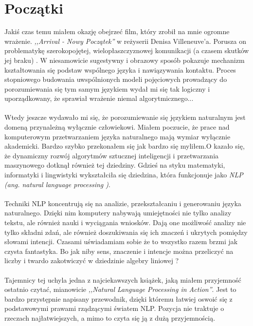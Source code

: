 \section{Początki}
Jakiś czas temu miałem okazję obejrzeć film, który zrobił na mnie ogromne wrażenie. \textit{,,Arrival - Nowy Początek''} w reżyserii Denisa Villeneuve’a.
Porusza on problematykę szerokopojętej, wielopłaszczyznowej komunikacji (a czasem skutków jej braku) . W niesamowicie sugestywny i obrazowy sposób pokazuje mechanizm kształtowania się podstaw wspólnego języka i nawiązywania kontaktu.
Proces stopniowego budowania uwspólnionych modeli pojęciowych prowadzący do porozumiewania się tym samym językiem wydał mi się tak logiczny i uporządkowany, że sprawiał wrażenie niemal algorytmicznego...

\paragraph{}
Wtedy jeszcze wydawało mi się, że porozumiewanie się językiem naturalnym jest domeną przynależną wyłącznie człowiekowi.
Miałem poczucie, że prace nad komputerowym przetwarzaniem języka naturalnego mają wymiar wyłącznie akademicki.
Bardzo szybko przekonałem się jak bardzo się myliłem.O kazało się, że dynamiczny rozwój algorytmów sztucznej inteligencji i
przetwarzania maszynowego dotknął również tej dziedziny. Gdzieś na styku matematyki, informatyki i lingwistyki wykształciła się
dziedzina, która funkcjonuje jako\textit{ NLP (ang.  natural language processing )}.
	
\paragraph{}
Techniki NLP koncentrują się na analizie, przekształcaniu i generowaniu języka naturalnego.
Dzięki nim komputery nabywają umiejętności nie tylko analizy tekstu, ale również nauki i wyciągania wniosków.
Dają one możliwość analizy nie tylko składni zdań, ale również doszukiwania się ich znaczeń i ukrytych pomiędzy słowami intencji.
Czasami uświadamiam sobie że to wszystko razem brzmi jak czysta fantastyka. Bo jak niby sens, znaczenie i intencje można przeliczyć na liczby i twardo
zakotwiczyć w dziedzinie algebry liniowej ?
\paragraph{}
Tajemnicy tej uchyla jedna z najciekawszych książek, jaką miałem przyjemność ostatnio czytać, mianowicie \textit{,,Natural Language Processing in Action''}.
Jest to bardzo przystępnie napisany przewodnik, dzięki któremu łatwiej oswoić się z podstawowymi prawami rządzącymi światem NLP.
Pozycja nie traktuje o rzeczach najłatwiejszych, a mimo to czyta się ją z dużą przyjemnością.
